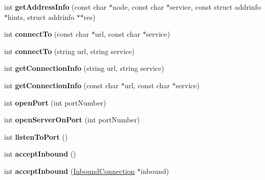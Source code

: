 \begin{DoxyCompactItemize}
\item 
\hypertarget{class_ivy_sox_aff0fa52c220a3aa04495ab0dcfcc26ac}{}int {\bfseries get\+Address\+Info} (const char $\ast$node, const char $\ast$service, const struct addrinfo $\ast$hints, struct addrinfo $\ast$$\ast$res)\label{class_ivy_sox_aff0fa52c220a3aa04495ab0dcfcc26ac}

\item 
\hypertarget{class_ivy_sox_a8a80d74a1d4063760b510b8b70b68827}{}int {\bfseries connect\+To} (const char $\ast$url, const char $\ast$service)\label{class_ivy_sox_a8a80d74a1d4063760b510b8b70b68827}

\item 
\hypertarget{class_ivy_sox_a07a9fd863e1505e42463039e22b1b559}{}int {\bfseries connect\+To} (string url, string service)\label{class_ivy_sox_a07a9fd863e1505e42463039e22b1b559}

\item 
\hypertarget{class_ivy_sox_a71b5da686074a1d701018923fabb5825}{}int {\bfseries get\+Connection\+Info} (string url, string service)\label{class_ivy_sox_a71b5da686074a1d701018923fabb5825}

\item 
\hypertarget{class_ivy_sox_a38e73e2c356bedc86324f6fbda9ad70a}{}int {\bfseries get\+Connection\+Info} (const char $\ast$url, const char $\ast$service)\label{class_ivy_sox_a38e73e2c356bedc86324f6fbda9ad70a}

\item 
\hypertarget{class_ivy_sox_a55e1513525983a401ad5916244ced260}{}int {\bfseries open\+Port} (int port\+Number)\label{class_ivy_sox_a55e1513525983a401ad5916244ced260}

\item 
\hypertarget{class_ivy_sox_af6aa28dbf15e687027ee4a9da8a47724}{}int {\bfseries open\+Server\+On\+Port} (int port\+Number)\label{class_ivy_sox_af6aa28dbf15e687027ee4a9da8a47724}

\item 
\hypertarget{class_ivy_sox_a0a149313db0d575fb8ca9970655b9b92}{}int {\bfseries listen\+To\+Port} ()\label{class_ivy_sox_a0a149313db0d575fb8ca9970655b9b92}

\item 
\hypertarget{class_ivy_sox_a15e215b14df6ffe8c6d11bcc5b4b64e3}{}int {\bfseries accept\+Inbound} ()\label{class_ivy_sox_a15e215b14df6ffe8c6d11bcc5b4b64e3}

\item 
\hypertarget{class_ivy_sox_a00f807d8ea581e601df13c21878b01ea}{}int {\bfseries accept\+Inbound} (\hyperlink{class_inbound_connection}{Inbound\+Connection} $\ast$inbound)\label{class_ivy_sox_a00f807d8ea581e601df13c21878b01ea}


\end{DoxyCompactItemize}
